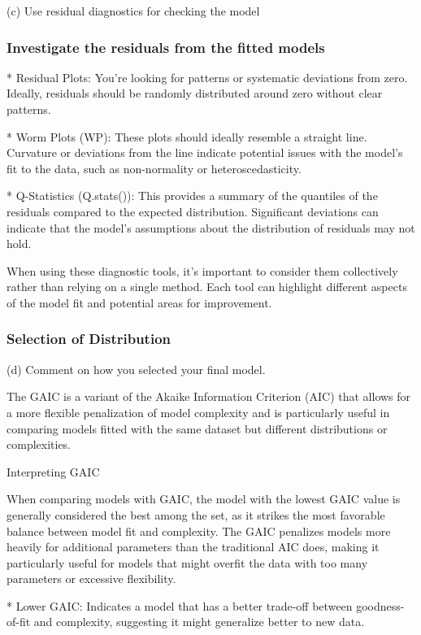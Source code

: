 (c) Use residual diagnostics for checking the model

\subsubsection{Investigate the residuals from the fitted models}

*    Residual Plots: You're looking for patterns or systematic deviations from zero. Ideally, residuals should be randomly distributed around zero without clear patterns.

*    Worm Plots (WP): These plots should ideally resemble a straight line. Curvature or deviations from the line indicate potential issues with the model's fit to the data, such as non-normality or heteroscedasticity.

*    Q-Statistics (Q.stats()): This provides a summary of the quantiles of the residuals compared to the expected distribution. Significant deviations can indicate that the model's assumptions about the distribution of residuals may not hold.

When using these diagnostic tools, it's important to consider them collectively rather than relying on a single method. Each tool can highlight different aspects of the model fit and potential areas for improvement.

\subsubsection{Selection of Distribution}
(d) Comment on how you selected your final model.


The GAIC is a variant of the Akaike Information Criterion (AIC) that allows for a more flexible penalization of model complexity and is particularly useful in comparing models fitted with the same dataset but different distributions or complexities.

Interpreting GAIC

When comparing models with GAIC, the model with the lowest GAIC value is generally considered the best among the set, as it strikes the most favorable balance between model fit and complexity. The GAIC penalizes models more heavily for additional parameters than the traditional AIC does, making it particularly useful for models that might overfit the data with too many parameters or excessive flexibility.

*    Lower GAIC: Indicates a model that has a better trade-off between goodness-of-fit and complexity, suggesting it might generalize better to new data.

